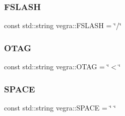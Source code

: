 \subsubsection{\texorpdfstring{F\+S\+L\+A\+SH}{FSLASH}}
{\footnotesize\ttfamily const std\+::string vegra\+::\+F\+S\+L\+A\+SH = \char`\"{}/\char`\"{}}

\mbox{\label{namespacevegra_a6497d9c2bf3f1c7851bb59fd5af18ec2}} 
\subsubsection{\texorpdfstring{O\+T\+AG}{OTAG}}
{\footnotesize\ttfamily const std\+::string vegra\+::\+O\+T\+AG = \char`\"{}$<$\char`\"{}}

\mbox{\label{namespacevegra_a490ca2f98836fa22a92f9e141cc7ab1e}} 
\subsubsection{\texorpdfstring{S\+P\+A\+CE}{SPACE}}
{\footnotesize\ttfamily const std\+::string vegra\+::\+S\+P\+A\+CE = \char`\"{} \char`\"{}}

